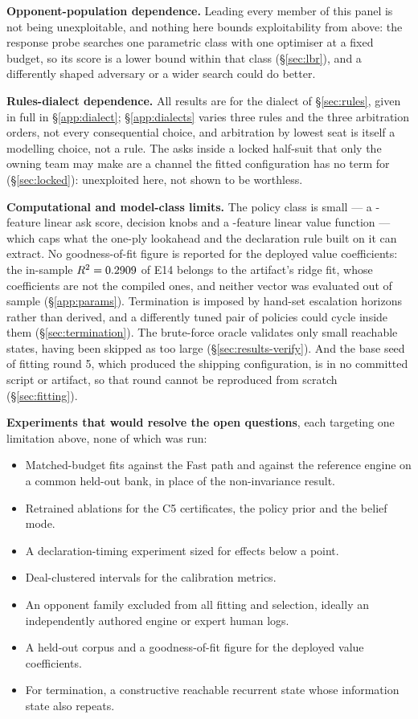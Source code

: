 \textbf{Opponent-population dependence.} Leading every member of this panel is
not being unexploitable, and nothing here bounds exploitability from above: the
response probe searches one parametric class with one optimiser at a fixed
budget, so its score is a lower bound within that class (\S\ref{sec:lbr}), and a
differently shaped adversary or a wider search could do better.

\textbf{Rules-dialect dependence.} All results are for the dialect of
\S\ref{sec:rules}, given in full in \S\ref{app:dialect}; \S\ref{app:dialects}
varies three rules and the three arbitration orders, not every consequential
choice, and arbitration by lowest seat is itself a modelling choice, not a rule.
The asks inside a locked half-suit that only the owning team may make are a
channel the fitted configuration has no term for (\S\ref{sec:locked}):
unexploited here, not shown to be worthless.

\textbf{Computational and model-class limits.} The policy class is small --- a
\numAskFeats-feature linear ask score, \numKnobs{} decision knobs and a
\numValueFeats-feature linear value function --- which caps what the one-ply
lookahead and the declaration rule built on it can extract. No goodness-of-fit
figure is reported for the deployed value coefficients: the in-sample
$R^2 = 0.2909$ of E14 belongs to the artifact's ridge fit, whose
coefficients are not the compiled ones, and neither vector was evaluated out of
sample (\S\ref{app:params}). Termination is imposed by hand-set escalation
horizons rather than derived, and a differently tuned pair of policies could
cycle inside them (\S\ref{sec:termination}). The brute-force oracle validates
only small reachable states, \numOracleStatesSkipped{} having been skipped as
too large (\S\ref{sec:results-verify}). And the base seed of fitting round 5,
which produced the shipping configuration, is in no committed script or artifact,
so that round cannot be reproduced from scratch (\S\ref{sec:fitting}).

\textbf{Experiments that would resolve the open questions}, each targeting one
limitation above, none of which was run:

\begin{itemize}[leftmargin=1.4em,itemsep=0pt,topsep=2pt,parsep=0pt]
\item Matched-budget fits against the Fast path and against the reference engine
on a common held-out bank, in place of the non-invariance result.
\item Retrained ablations for the C5 certificates, the policy prior and the
belief mode.
\item A declaration-timing experiment sized for effects below a point.
\item Deal-clustered intervals for the calibration metrics.
\item An opponent family excluded from all fitting and selection, ideally an
independently authored engine or expert human logs.
\item A held-out corpus and a goodness-of-fit figure for the deployed value
coefficients.
\item For termination, a constructive reachable recurrent state whose
information state also repeats.
\end{itemize}
